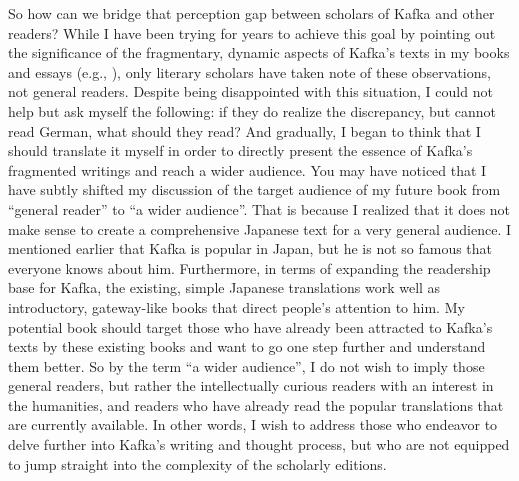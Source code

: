 \begin{paper}
So how can we bridge that perception gap between scholars of Kafka and
other readers? While I have been trying for years to achieve this goal by pointing
out the significance of the fragmentary, dynamic aspects of Kafka's
texts in my books and essays (e.g., \cite{myojo_atarashii_2002}), only literary scholars
have taken note of these observations, not general readers. Despite
being disappointed with this situation, I could not help but ask myself
the following: if they do realize the discrepancy, but cannot read
German, what should they read? And gradually, I began to think that I
should translate it myself in order to directly present the essence of
Kafka's fragmented writings and reach a wider audience. You may have noticed that I have subtly shifted my discussion of the target audience of my future book from ``general reader'' to ``a wider audience''. That is because I realized that it does not
make sense to create a comprehensive Japanese text for a very general
audience. I mentioned earlier that Kafka is popular in Japan, but he is
not so famous that everyone knows about him. Furthermore, in terms of
expanding the readership base for Kafka, the existing, simple Japanese
translations work well as introductory, gateway-like books that
direct people's attention to him. My potential book should target those
who have already been attracted to Kafka's texts by these existing books
and want to go one step further and understand them better. So by the
term ``a wider audience'', I do not wish to imply those general readers,
but rather the intellectually curious readers with an interest in the
humanities, and readers who have already read the popular translations
that are currently available. In other words, I wish to address those
who endeavor to delve further into Kafka's writing and thought process,
but who are not equipped to jump straight into the complexity of the
scholarly editions.


\end{paper}
